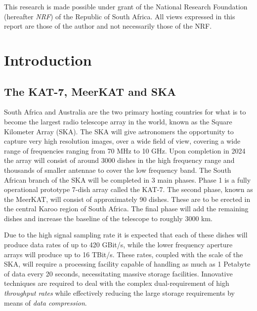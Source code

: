 This research is made possible under grant of the National Research Foundation (hereafter \textit{NRF}) of the Republic of South Africa. All views expressed in this report are those of the author and not 
necessarily those of the NRF.

\pagebreak
\tableofcontents
\pagebreak
\listoffigures
\pagebreak
{}
\section{Introduction}
\subsection{The KAT-7, MeerKAT and SKA}
South Africa and Australia are the two primary hosting countries for what is to become the largest radio telescope array in the world, known as the Square Kilometer Array (SKA). 
The SKA will give astronomers the opportunity to capture very high resolution images, over a wide field of view, covering a wide range of frequencies ranging 
from 70 MHz to 10 GHz. Upon completion in 2024 the array will consist of around 3000 dishes in the high frequency range and thousands of smaller antennae to 
cover the low frequency band. The South African branch of the SKA will be completed in 3 main phases. Phase 1 is a fully operational prototype 7-dish array 
called the KAT-7. The second phase, known as the MeerKAT, will consist of approximately 90 dishes. These are to be erected in the central Karoo region of South Africa. 
The final phase will add the remaining dishes and increase the baseline of the telescope to roughly 3000 km.

Due to the high signal sampling rate it is expected that each of these dishes will produce data rates of up to 420 GBit/s, while the lower frequency aperture arrays 
will produce up to 16 TBit/s. These rates, coupled with the scale of the SKA, will require a processing facility capable of handling as much as 1 Petabyte of 
data every 20 seconds, necessitating massive storage facilities. Innovative techniques are required to deal with the complex dual-requirement of high 
\textit{throughput rates} while effectively reducing the large storage requirements by means of \textit{data compression}. 
